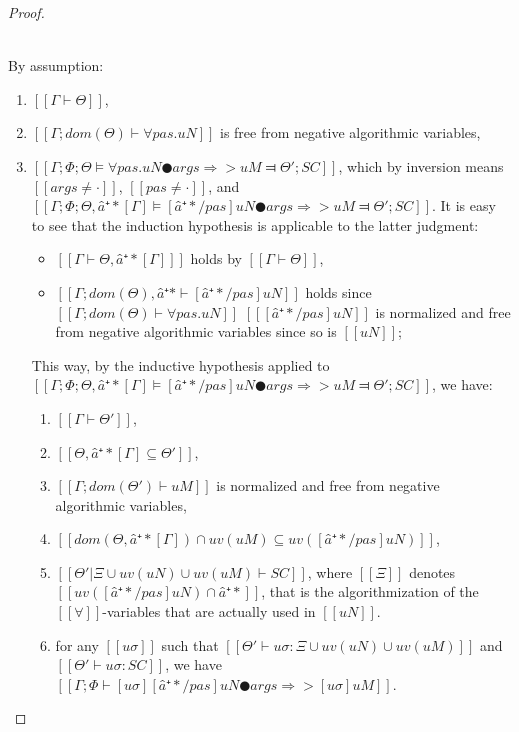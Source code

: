 \begin{proof}
\begin{caseof}
        \item {}\\
            By assumption:
            \begin{enumerate}
                \item $[[Γ ⊢ Θ]]$,
                \item $[[Γ; dom(Θ) ⊢  ∀pas.uN]]$ is free from negative algorithmic variables,
                \item $[[Γ; Φ; Θ ⊨ ∀pas.uN ● args ⇒> uM ⫤ Θ'; SC]]$, which by inversion means
                    $[[args ≠ ·]]$, $[[pas ≠ ·]]$, and $[[Γ; Φ; Θ, â⁺*[Γ] ⊨ [â⁺*/pas]uN ● args ⇒> uM ⫤ Θ'; SC]]$.
                    It is easy to see that the induction hypothesis is applicable to the latter judgment:
                    \begin{itemize}
                        \item $[[Γ ⊢ Θ, â⁺*[Γ] ]]$ holds by $[[Γ ⊢ Θ]]$, 
                        \item $[[Γ; dom(Θ), â⁺* ⊢ [â⁺*/pas]uN]]$
                            holds since $[[Γ; dom(Θ) ⊢ ∀pas.uN]]$
                            $[[ [â⁺*/pas]uN ]]$ is normalized and free from negative algorithmic variables
                            since so is $[[uN]]$;
                    \end{itemize}
                    This way, by the inductive hypothesis applied to 
                    $[[Γ; Φ; Θ, â⁺*[Γ] ⊨ [â⁺*/pas]uN ● args ⇒> uM ⫤ Θ'; SC]]$,
                    we have:
                    \begin{enumerate}
                        \item $[[Γ ⊢ Θ']]$,
                        \item $[[Θ, â⁺*[Γ] ⊆ Θ']]$,
                        \item $[[Γ; dom(Θ') ⊢ uM]]$ is normalized and free from negative algorithmic variables,
                        \item $[[dom(Θ, â⁺*[Γ]) ∩ uv(uM) ⊆ uv([â⁺*/pas]uN)]]$,
                        \item $[[Θ'|Ξ ∪ uv(uN) ∪ uv(uM) ⊢ SC]]$, where $[[Ξ]]$ denotes $[[uv([â⁺*/pas]uN) ∩ {â⁺*}]]$,
                            that is the algorithmization of the $[[∀]]$-variables that are actually used in $[[uN]]$.
                        \item  \label{typing-soundness:forall-ih}
                            for any 
                            $[[uσ]]$ such that 
                            $[[Θ' ⊢ uσ : Ξ ∪ uv(uN) ∪ uv(uM)]]$ and $[[ Θ' ⊢ uσ : SC ]]$, 
                            we have $[[ Γ ; Φ ⊢ [uσ][â⁺*/pas]uN ● args ⇒> [uσ]uM ]]$.
                    \end{enumerate}
            \end{enumerate}


\end{caseof}
\end{proof}
